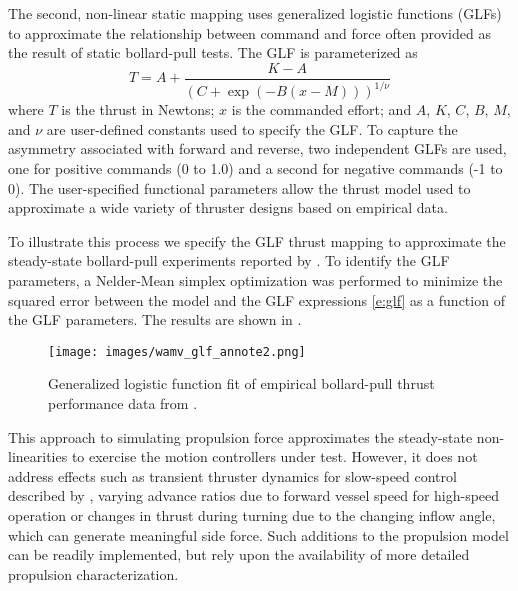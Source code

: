 \documentclass[utf8]{frontiersSCNS} %
\begin{document}
The second, non-linear static mapping uses generalized logistic functions (GLFs) to approximate the relationship between command and force often provided as the result of static bollard-pull tests.  The GLF is parameterized as 
\begin{equation}
  T = A + \frac{K-A}{\left(C+\exp(-B(x-M))\right)^{1/\nu}}
  \label{e:glf}
\end{equation}
where $T$ is the thrust in Newtons; $x$ is the commanded effort; and $A$, $K$, $C$, $B$, $M$, and $\nu$ are user-defined constants used to specify the GLF. To capture the asymmetry associated with forward and reverse, two independent GLFs are used, one for positive commands (0 to 1.0) and a second for negative commands (-1 to 0).  The user-specified functional parameters allow the thrust model used to approximate a wide variety of thruster designs based on empirical data.

To illustrate this process we specify the GLF thrust mapping to approximate the  steady-state bollard-pull experiments reported by \citet{sarda16station}.  To identify the GLF parameters, a Nelder-Mean simplex optimization was performed to minimize the squared error between the model and the GLF expressions \eqref{e:glf} as a function of the GLF parameters.  The results are shown in .
\begin{figure}[h]
  \centering
  \texttt{[image: images/wamv\_glf\_annote2.png]}
  \caption{Generalized logistic function fit of empirical  bollard-pull thrust performance data from \citep{sarda16station}.}
  \label{f:fit}
\end{figure}

This approach to simulating propulsion force approximates the steady-state non-linearities to exercise the motion controllers under test.  However, it does not address effects such as transient thruster dynamics for slow-speed control described by \citet{whitcomb99development}, varying advance ratios due to forward vessel speed for high-speed operation or changes in thrust during turning due to the changing inflow angle, which can generate meaningful side force.  Such additions to the propulsion model can be readily implemented, but rely upon the availability of more detailed propulsion characterization.
\end{document}
